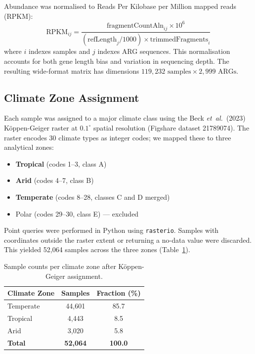 \documentclass[12pt,a4paper]{article}
\begin{document}
Abundance was normalised to Reads Per Kilobase per Million mapped reads
(RPKM):
\begin{equation}
  \text{RPKM}_{ij} =
    \frac{\text{fragmentCountAln}_{ij} \times 10^{6}}
         {\left(\text{refLength}_{j} / 1000\right)
          \times \text{trimmedFragments}_{i}}
  \label{eq:rpkm}
\end{equation}
where $i$ indexes samples and $j$ indexes ARG sequences.
This normalisation accounts for both gene length bias and variation in
sequencing depth.
The resulting wide-format matrix has dimensions
$119{,}232 \text{ samples} \times 2{,}999 \text{ ARGs}$.

\subsection{Climate Zone Assignment}\label{sec:zones}

Each sample was assigned to a major climate class using the
Beck \emph{et~al.}\ (2023) K{\"o}ppen-Geiger raster at
$0.1^\circ$ spatial resolution (Figshare dataset 21789074).
The raster encodes 30 climate types as integer codes; we mapped
these to three analytical zones:
\begin{itemize}
  \item \textbf{Tropical} (codes 1--3, class A)
  \item \textbf{Arid} (codes 4--7, class B)
  \item \textbf{Temperate} (codes 8--28, classes C and D merged)
  \item Polar (codes 29--30, class E) --- excluded
\end{itemize}
Point queries were performed in Python using \texttt{rasterio}.
Samples with coordinates outside the raster extent or returning a
no-data value were discarded.
This yielded 52,064 samples across the three zones
(Table~\ref{tab:zones}).

\begin{table}[htbp]
  \centering
  \caption{Sample counts per climate zone after K{\"o}ppen-Geiger
           assignment.}
  \label{tab:zones}
  \begin{tabular}{lcc}
    \toprule
    Climate Zone & Samples & Fraction (\%) \\
    \midrule
    Temperate    & 44,601  & 85.7 \\
    Tropical     &  4,443  &  8.5 \\
    Arid         &  3,020  &  5.8 \\
    \midrule
    \textbf{Total} & \textbf{52,064} & \textbf{100.0} \\
    \bottomrule
  \end{tabular}
\end{table}
\end{document}
